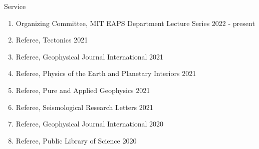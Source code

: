 \begin{rSection}{Service}
	\begin{enumerate}
		\item Organizing Committee, MIT EAPS Department Lecture Series \hfill 2022 - present
		\item Referee, Tectonics \hfill 2021
		\item Referee, Geophysical Journal International \hfill 2021
		\item Referee, Physics of the Earth and Planetary Interiors \hfill 2021
		\item Referee, Pure and Applied Geophysics \hfill 2021
		\item Referee, Seismological Research Letters \hfill 2021
		\item Referee, Geophysical Journal International \hfill 2020
		\item Referee, Public Library of Science \hfill 2020
	\end{enumerate}
\end{rSection}
